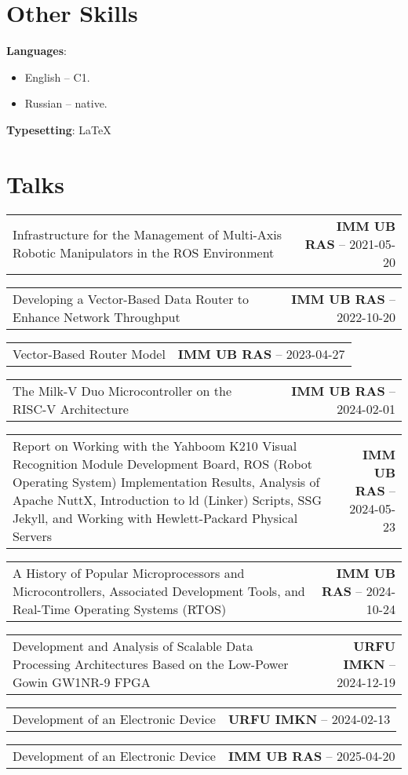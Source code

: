 \documentclass[a4paper,11pt]{article}
\begin{document}
\section{Other Skills}
\begin{itemize}[leftmargin=0.15in, label={}]
    \normalsize{\item{
                    \textbf{Languages}{:}
                    \begin{itemize}
                        \item English -- C1.
                        \item Russian -- native.
                    \end{itemize}
                    \textbf{Typesetting}{: \LaTeX} \\
              }}
\end{itemize}


\newcommand{\talkentry}[2]{%
    \item %
    \noindent %
    \begin{tabularx}{\linewidth}[t]{@{} X @{\hspace{2em}} r @{}}
        #1 & %
        #2   %
    \end{tabularx}%
}

\section{Talks}
\begin{enumerate}[leftmargin=0.35in, labelindent=0pt, itemsep=1.5pt]
\normalsize{
    \talkentry{Infrastructure for the Management of Multi-Axis Robotic Manipulators in the ROS Environment}{\textbf{IMM UB RAS} -- 2021-05-20}
    \talkentry{Developing a Vector-Based Data Router to Enhance Network Throughput}{\textbf{IMM UB RAS} -- 2022-10-20}
    \talkentry{Vector-Based Router Model}{\textbf{IMM UB RAS} -- 2023-04-27}
    \talkentry{The Milk-V Duo Microcontroller on the RISC-V Architecture}{\textbf{IMM UB RAS} -- 2024-02-01}
    \talkentry{Report on Working with the Yahboom K210 Visual Recognition Module Development Board, ROS (Robot Operating System) Implementation Results, Analysis of Apache NuttX, Introduction to ld (Linker) Scripts, SSG Jekyll, and Working with Hewlett-Packard Physical Servers}{\textbf{IMM UB RAS} -- 2024-05-23}
    \talkentry{A History of Popular Microprocessors and Microcontrollers, Associated Development Tools, and Real-Time Operating Systems (RTOS)}{\textbf{IMM UB RAS} -- 2024-10-24}
    \talkentry{Development and Analysis of Scalable Data Processing Architectures Based on the Low-Power Gowin GW1NR-9 FPGA}{\textbf{URFU IMKN} -- 2024-12-19}
    \talkentry{Development of an Electronic Device}{\textbf{URFU IMKN} -- 2024-02-13}
    \talkentry{Development of an Electronic Device}{\textbf{IMM UB RAS} -- 2025-04-20}
}
\end{enumerate}
\end{document}
